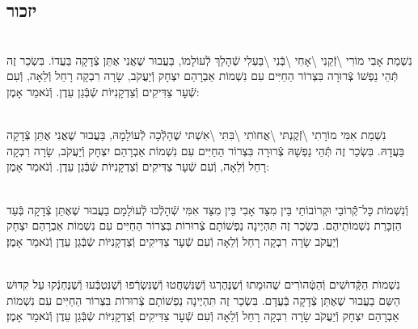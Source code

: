 \documentclass[twoside, openany, parskip=half, 11pt]{book}
\begin{document}
\begin{sometimes}
 \vfill
{}


\sepline



\chapter[יזכור]{ יזכור }

 

\\
 נִשְׁמַת אָבִי מוֹרִי \textbackslash זְֿקֵנִי \textbackslash אָחִי \textbackslash בְּֿנִי \textbackslash בַּעְלִי  שְֿׁהָלַךְ לְֿעוֹלָמוֹ, בַּעֲבוּר שֶׁאֲנִי אֶתֵּן צְֿדָקָה בַּעֲדוֹ. בִּשְׂכַר זֶה תְּֿהֵי נַפְשׁוֹ צְֿרוּרָה בִּצְרוֹר הַחַיִּים עִם נִשְׁמוֹת אַבְרָהַם יִצְחָק וְֿיַעֲקֹב, שָׂרָה רִבְקָה רָחֵל וְֿלֵאָה, וְֿעִם שְֿׁעָר צַדִּיקִים וְֿצַדְקָנִיּוֹת שְֿבְּֿגַן עֵדֶן. וְֿנֹאמַר אָמֶן:

 \\
 נִשְׁמַת אִמִּי מוֹרָתִי \textbackslash זְֿקֶנְתּי \textbackslash אֲחוׂתִי \textbackslash בִּתִּי \textbackslash אִשְׁתּי
 שֶׁהָלְֿכָה לְֿעוֹלָמָהּ, בַּעֲבוּר שֶׁאֲנִי אֶתֵּן צְֿדָקָה בַּעֲדָהּ. בִּשְׂכַר זֶה תְּֿהֵי נַפְשָׁהּ צְֿרוּרָה בִּצְרוֹר הַחַיִּים עִם נִשְׁמוֹת אַבְרָהַם יִצְחָק וְֿיַעֲקֹב, שָׂרָה רִבְקָה רָחֵל וְֿלֵאָה, וְֿעִם שְֿׁעָר צַדִּיקִים וְֿצַדְקָנִיּוֹת שְֿבְּֿגַן עֵדֶן. וְֿנֹאמַר אָמֶן:

 \\
 וְֿנִשְׁמוֹת כָּל־קְֿֿרוֹבַי וּקְרוֹבוֹתַי בֵּין מִצַּד אָבִי בֵּין מִצַּד אִמִּי
 שְֿׁהָלְֿכוּ לְֿעוׂלָמָם
 בַעֲבוּר שֶׁאֶתֵּן צְֿדָקָה בְּֿעַד הַזְכָּרַת נִשְׁמוֹתֵיהֶם. בִּשְׂכַר זֶה תִּהְיֶינָה נַפְשׁוֹתָם צְֿרוּרוֹת בִּצְרוֹר הַחַיִּים עִם נִשְׁמוֹת אַבְרָהַם יִצְחָק וְֿיַעֲקֹב שָׂרָה רִבְקָה רָחֵל וְֿלֵאָה וְֿעִם שְֿׁעָר צַדִּיקִים וְֿצַדְקָנִיּוֹת שְֿבְּֿגַן עֵדֶן וְֿנֹאמַר אָמֶן׃



\\
 נִשְׁמוׂת הַקְּֿדוׂשִׁים וְֿהַטְּֿהוׂרִים
 שֶׁהוּמָתוּ וְֿשֶנֶּהֶרְגוּ וְֿשֶׁנִּשְׁחֲטוּ וְֿשֶׁנִּשְׂרְֿפוּ וְֿשֶׁנִּטְבְּֿעוּ וְֿשֶׁנֶּחְנְֿקוּ עַל קִדּוּשׁ הַשֵּם בַעֲבוּר שֶׁאֶתֵּן צְֿדָקָה בְּֿעֲדָם. בִּשְׂכַר זֶה תִּהְיֶינָה נַפְשׁוֹתָם צְֿרוּרוֹת בִּצְרוֹר הַחַיִּים עִם נִשְׁמוֹת אַבְרָהַם יִצְחָק וְֿיַעֲקֹב שָׂרָה רִבְקָה רָחֵל וְֿלֵאָה וְֿעִם שְֿׁעָר צַדִּיקִים וְֿצַדְקָנִיּוֹת שְֿבְּֿגַן עֵדֶן וְֿנֹאמַר אָמֶן׃
%

\end{sometimes}
\end{document}
